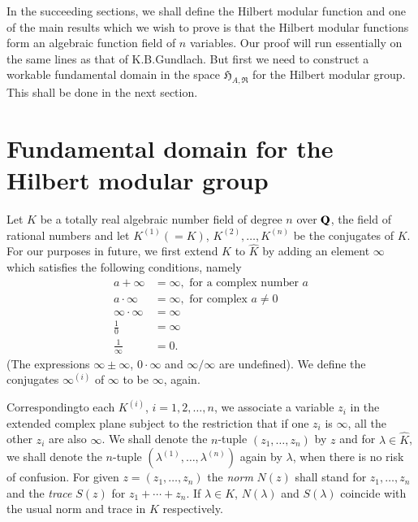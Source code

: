 In the succeeding sections, we shall define the Hilbert modular
function and one of the main results which we wish to prove is that
the Hilbert modular functions form an algebraic function field of $n$
variables. Our proof will run essentially on the same lines as that of
K.B.\@ Gundlach. But first we need to construct a workable fundamental
domain in the space $\mathfrak{H}_{A,\mathfrak{R}}$ for the Hilbert
modular group. This shall be done in the next section.

\section[Fundamental domain for the Hilbert modular
  group]{Fundamental domain for the Hilbert modular\hfil\break
  group}\label{chap3:sec2}

Let $K$ be a totally real algebraic number field of degree $n$ over
$\mathbf{Q}$, the field of rational numbers and let $K^{(1)}(=K)$,
$K^{(2)},\ldots,K^{(n)}$ be the conjugates of $K$. For our purposes in
future, we first extend $K$ to $\hat{K}$ by adding an element
$\infty$ which satisfies the following conditions, namely
\begin{align*}
a+\infty &= \infty, \text{ for a complex number } a\\
a\cdot \infty &= \infty, \text{ for complex } a\neq 0\\
\infty\cdot \infty &= \infty\\
\frac{1}{0} &= \infty\\
\frac{1}{\infty} &= 0.
\end{align*}
(The expressions $\infty\pm\infty$, $0\cdot\infty$ and $\infty/\infty$
are undefined). We define the conjugates $\infty^{(i)}$ of $\infty$ to
be $\infty$, again.

Corresponding\pageoriginale to each $K^{(i)}$, $i=1,2,\ldots,n$, we
associate a variable $z_{i}$ in the extended complex plane subject to
the restriction that if one $z_{i}$ is $\infty$, all the other $z_{i}$
are also $\infty$. We shall denote the $n$-tuple
$(z_{1},\ldots,z_{n})$ by $z$ and for $\lambda\in\hat{K}$, we
shall denote the $n$-tuple $(\lambda^{(1)},\ldots,\lambda^{(n)})$
again by $\lambda$, when there is no risk of confusion. For given
$z=(z_{1},\ldots,z_{n})$ the {\em norm} $N(z)$ shall stand for
$z_{1},\ldots,z_{n}$ and the {\em trace} $S(z)$ for
$z_{1}+\cdots+z_{n}$. If $\lambda\in K$, $N(\lambda)$ and $S(\lambda)$
coincide with the usual norm and trace in $K$ respectively.

